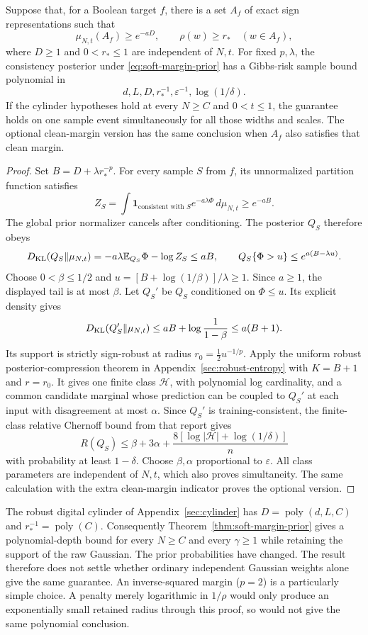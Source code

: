 \begin{theorem}
\label{thm:soft-margin-prior}
Suppose that, for a Boolean target $f$, there is a set $A_f$ of exact sign
representations such that
\[
 \mu_{N,t}(A_f)\ge e^{-aD},\qquad
 \rho(w)\ge r_*\quad(w\in A_f),
\]
where $D\ge1$ and $0<r_*\le1$ are independent of $N,t$.
For fixed $p,\lambda$, the consistency posterior under
\eqref{eq:soft-margin-prior} has a Gibbs-risk sample bound polynomial in
\[
 d,L,D,r_*^{-1},\varepsilon^{-1},\log(1/\delta).
\]
If the cylinder hypotheses hold at every $N\ge C$ and $0<t\le1$, the
guarantee holds on one sample event simultaneously for all those widths
and scales. The optional clean-margin version has the same conclusion
when $A_f$ also satisfies that clean margin.
\end{theorem}

\begin{proof}
Set $B=D+\lambda r_*^{-p}$. For every sample $S$ from $f$, its unnormalized
partition function satisfies
\[
 Z_S=\int \mathbf1_{\text{consistent with }S}
                 e^{-a\lambda\Phi}\,d\mu_{N,t}\ge e^{-aB}.
\]
The global prior normalizer cancels after conditioning. The posterior
$Q_S$ therefore obeys
\[
 D_{\rm KL}(Q_S\Vert\mu_{N,t})
  =-a\lambda\mathbb E_{Q_S}\Phi-\log Z_S\le aB,
 \qquad
 Q_S\{\Phi>u\}\le e^{a(B-\lambda u)}.
\]
Choose $0<\beta\le1/2$ and
$u=[B+\log(1/\beta)]/\lambda\ge1$. Since $a\ge1$, the displayed tail is
at most $\beta$. Let $Q_S'$ be $Q_S$ conditioned on $\Phi\le u$. Its
explicit density gives
\[
 D_{\rm KL}(Q_S'\Vert\mu_{N,t})
  \le aB+\log\frac1{1-\beta}\le a(B+1).
\]
Its support is strictly sign-robust at radius
$r_0=\tfrac12u^{-1/p}$. Apply the uniform robust posterior-compression
theorem in Appendix~\ref{sec:robust-entropy} with $K=B+1$ and $r=r_0$. It gives one
finite class $\mathcal H$, with polynomial log cardinality, and a common
candidate marginal whose prediction can be coupled to $Q_S'$ at each
input with disagreement at most $\alpha$.
Since $Q_S'$ is training-consistent, the finite-class relative Chernoff
bound from that report gives
\[
 R(Q_S)\le\beta+3\alpha+
       \frac{8[\log|\mathcal H|+\log(1/\delta)]}{n}
\]
with probability at least $1-\delta$. Choose $\beta,\alpha$ proportional
to $\varepsilon$. All class parameters are independent of $N,t$, which
also proves simultaneity. The same calculation with the extra clean-margin
indicator proves the optional version.
\end{proof}

The robust digital cylinder of Appendix~\ref{sec:cylinder} has
$D=\operatorname{poly}(d,L,C)$ and $r_*^{-1}=\operatorname{poly}(C)$.
Consequently Theorem~\ref{thm:soft-margin-prior} gives a polynomial-depth
bound for every $N\ge C$ and every $\gamma\ge1$ while retaining the support
of the raw Gaussian. The prior probabilities have changed. The result
therefore does not settle whether ordinary independent Gaussian weights
alone give the same guarantee.
An inverse-squared margin ($p=2$) is a particularly simple choice.
A penalty merely logarithmic in $1/\rho$ would only produce an exponentially
small retained radius through this proof, so would not give the same
polynomial conclusion.

